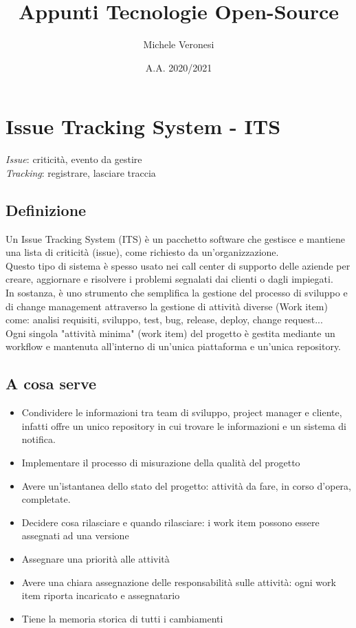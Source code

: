 \documentclass[10pt, a4paper]{article}
\title{Appunti Tecnologie Open-Source}
\date{A.A. 2020/2021}
\author{Michele Veronesi}
\begin{document}
\maketitle
\tableofcontents

\newpage
\section{Issue Tracking System - ITS}
\textit{Issue}: criticità, evento da gestire\\
\textit{Tracking}: registrare, lasciare traccia
\subsection{Definizione}
Un Issue Tracking System (ITS) è un pacchetto software che gestisce e mantiene una lista di criticità (issue), come richiesto da un'organizzazione.\\
Questo tipo di sistema è spesso usato nei call center di supporto delle aziende per creare, aggiornare e risolvere i problemi segnalati dai clienti o dagli impiegati.\\
In sostanza, è uno strumento che semplifica la gestione del processo di sviluppo e di change management attraverso la gestione di attività diverse (Work item) come: analisi requisiti, sviluppo, test,  bug, release, deploy, change request...\\
Ogni singola "attività minima" (work item) del progetto è gestita mediante un workflow e mantenuta all'interno di un'unica piattaforma e un'unica repository.

\subsection{A cosa serve}
\begin{itemize}
\item Condividere le informazioni tra team di sviluppo, project manager e cliente, infatti offre un unico repository in cui trovare le informazioni e un sistema di notifica.
\item Implementare il processo di misurazione della qualità del progetto
\item Avere un'istantanea dello stato del progetto: attività da fare, in corso d'opera, completate.
\item Decidere cosa rilasciare e quando rilasciare: i work item possono essere assegnati ad una versione
\item Assegnare una priorità alle attività
\item Avere una chiara assegnazione delle responsabilità sulle attività: ogni work item riporta incaricato e assegnatario
\item Tiene la memoria storica di tutti i cambiamenti
\end{itemize}
\end{document}
